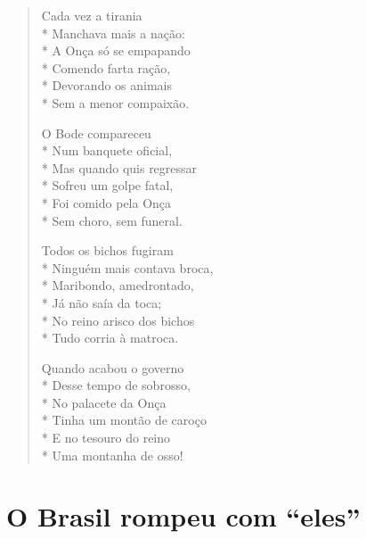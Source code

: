 \begin{verse}
Cada vez a tirania\\*
Manchava mais a nação:\\*
A Onça só se empapando\\*
Comendo farta ração,\\*
Devorando os animais\\*
Sem a menor compaixão.

O Bode compareceu\\*
Num banquete oficial,\\*
Mas quando quis regressar\\*
Sofreu um golpe fatal,\\*
Foi comido pela Onça\\*
Sem choro, sem funeral.

Todos os bichos fugiram\\*
Ninguém mais contava broca,\\*
Maribondo, amedrontado,\\*
Já não saía da toca;\\*
No reino arisco dos bichos\\*
Tudo corria à matroca.

Quando acabou o governo\\*
Desse tempo de sobrosso,\\*
No palacete da Onça\\*
Tinha um montão de caroço\\*
E no tesouro do reino\\*
Uma montanha de osso!
\end{verse}

\chapter{O Brasil rompeu com “eles”}

